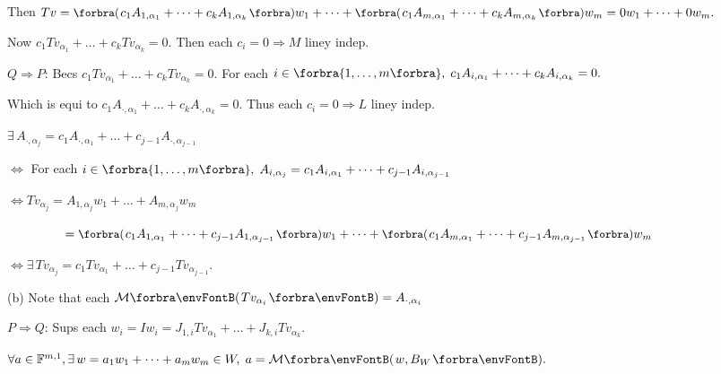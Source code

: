 Then $Tv=\BigPar{c_1A_{1,{\alpha_1}}+\dots+c_kA_{1,{\alpha_k}}}w_1+\dots+\BigPar{c_1A_{m,{\alpha_1}}+\dots+c_kA_{m,{\alpha_k}}}w_m=0w_1+\dots+0w_m.$\par\quad\Ha
{}Now $c_1Tv_{\alpha_1}+\dots+c_kTv_{\alpha_k}=0.$ Then each $c_i=0\Rightarrow M$ liney indep.\vspace{4pt}\par\quad\Ha
$Q\Rightarrow P:$\,\;Becs $c_1Tv_{\alpha_1}+\dots+c_kTv_{\alpha_k}=0.$ For each $i\in\Bra{1,\dots,m},\;c_1A_{i,{\alpha_1}}+\dots+c_kA_{i,{\alpha_k}}=0.$\par\quad\Ha
{}Which is equi to $c_1A_{\cdot,{\alpha_1}}+\dots+c_kA_{\cdot,{\alpha_k}}=0.$ \;Thus each $c_i=0\Rightarrow L$ liney indep.\par\vspace{4pt}\quad\Ha
\Or\;$\exists\,A_{\cdot,{\alpha_j}}=c_1A_{\cdot,{\alpha_1}}+\dots+c_{j-1}A_{\cdot,{\alpha_{j-1}}}$\par\quad\Ha
\Blind{\Or\;}$\Longleftrightarrow$ For each $i\in\Bra{1,\dots,m},\;A_{i,{\alpha_j}}=c_1A_{i,{\alpha_1}}+\dots+c_{j-1}A_{i,{\alpha_{j-1}}}$\par\quad\Ha
\Blind{\Or\;}$\Longleftrightarrow Tv_{\alpha_j}=A_{1,{\alpha_j}}w_1+\dots+A_{m,{\alpha_j}}w_m$\par\vspace{2pt}\quad\Ha
\Blind{\Or\;}$\Blind{\Longleftrightarrow Tv_{\alpha_j}}=\BigPar{c_1A_{1,{\alpha_1}}+\dots+c_{j-1}A_{1,{\alpha_{j-1}}}}w_1+\dots+\BigPar{c_1A_{m,{\alpha_1}}+\dots+c_{j-1}A_{m,{\alpha_{j-1}}}}w_m$\par\vspace{2pt}\quad\Ha
\Blind{\Or\;}$\Longleftrightarrow\exists\,Tv_{\alpha_j}=c_1Tv_{\alpha_1}+\dots+c_{j-1}Tv_{\alpha_{j-1}}.$\par\vspace{6pt}\quad
(b) Note that each $\Mt{Tv_{\alpha_i}}=A_{\cdot,\alpha_i}$\par\quad\Hb
$P\Rightarrow Q:$\,\;Sups each $w_i=Iw_i=J_{1,i}Tv_{\alpha_1}+\dots+J_{k,i}Tv_{\alpha_k}.$\par\quad\Hb
$\forall a\in\Fbb^{m,1},\exists\,w=a_1w_1+\dots+a_mw_m\in W,\;a=\Mt{w,B_W}.$\par\quad\Hb
